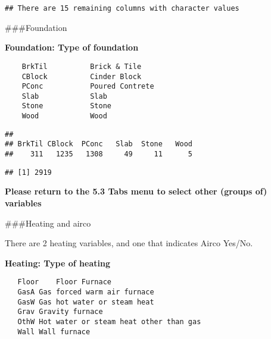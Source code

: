 \documentclass[]{article}
\newenvironment{Shaded}{\begin{snugshade}}{\end{snugshade}}
\newcommand{\CommentTok}[1]{\textcolor[rgb]{0.56,0.35,0.01}{\textit{#1}}}
\newcommand{\KeywordTok}[1]{\textcolor[rgb]{0.13,0.29,0.53}{\textbf{#1}}}
\newcommand{\NormalTok}[1]{#1}
\newcommand{\OperatorTok}[1]{\textcolor[rgb]{0.81,0.36,0.00}{\textbf{#1}}}
\newcommand{\StringTok}[1]{\textcolor[rgb]{0.31,0.60,0.02}{#1}}
\begin{document}
\begin{verbatim}
## There are 15 remaining columns with character values
\end{verbatim}

\#\#\#Foundation

\textbf{Foundation: Type of foundation}

\begin{verbatim}
    BrkTil          Brick & Tile
    CBlock          Cinder Block
    PConc           Poured Contrete 
    Slab            Slab
    Stone           Stone
    Wood            Wood
\end{verbatim}

\begin{Shaded}
\end{Shaded}

\begin{verbatim}
## 
## BrkTil CBlock  PConc   Slab  Stone   Wood 
##    311   1235   1308     49     11      5
\end{verbatim}

\begin{Shaded}
\end{Shaded}

\begin{verbatim}
## [1] 2919
\end{verbatim}

\textbf{Please return to the 5.3 Tabs menu to select other (groups of)
variables}

\#\#\#Heating and airco

There are 2 heating variables, and one that indicates Airco Yes/No.

\textbf{Heating: Type of heating}

\begin{verbatim}
   Floor    Floor Furnace
   GasA Gas forced warm air furnace
   GasW Gas hot water or steam heat
   Grav Gravity furnace 
   OthW Hot water or steam heat other than gas
   Wall Wall furnace
   
\end{verbatim}
\end{document}

